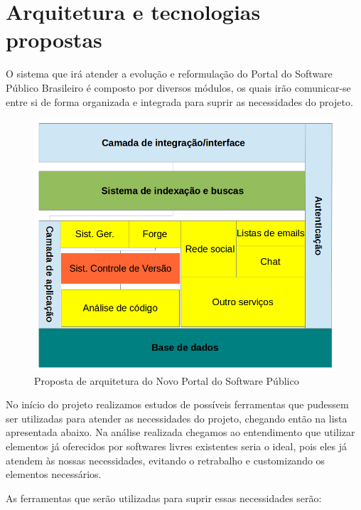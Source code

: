 \section{Arquitetura e tecnologias propostas}
\label{sec:arquitetura}

O sistema que irá atender a evolução e reformulação do Portal do Software Público Brasileiro é composto por diversos módulos, os quais irão comunicar-se entre si de forma organizada e integrada para suprir as necessidades do projeto.
%

\begin{figure}[htpb]
  \begin{center}
    \includegraphics[width=.37\textwidth]{images/visao_arq.png}
  \end{center}
  \caption{Proposta de arquitetura do Novo Portal do Software Público}
  \label{fig:core_concurrent}
\end{figure}

No início do projeto realizamos estudos de possíveis ferramentas que pudessem ser utilizadas para atender as necessidades do projeto, chegando então na lista apresentada abaixo.
Na análise realizada chegamos ao entendimento que utilizar elementos já oferecidos por softwares livres existentes seria o ideal, pois eles já atendem às nossas necessidades, evitando o retrabalho e customizando os elementos necessários.   

As ferramentas que serão utilizadas para suprir essas necessidades serão:


